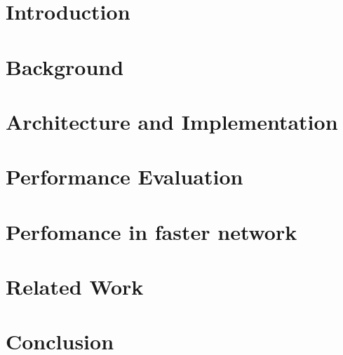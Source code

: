 

\chapter{Introduction}


\chapter{Background}\label{chapter:Background}


\chapter{Architecture and Implementation}\label{chapter:Architecture and Implementation}



\chapter{Performance Evaluation}\label{chapter:Performance Evaluation}


\chapter{Perfomance in faster network}\label{chapter:Further Improvement}


\chapter{Related Work}\label{chapter:Related Work}


\chapter{Conclusion}\label{chapter:Conclusion and future work}


%



